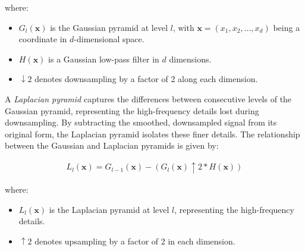 where:
\begin{itemize}
  \item \(G_l(\mathbf{x})\) is the Gaussian pyramid at level \(l\), with \(\mathbf{x} = (x_1, x_2, \dots, x_d)\) being a coordinate in \(d\)-dimensional space.
  \item \(H(\mathbf{x})\) is a Gaussian low-pass filter in \(d\) dimensions.
  \item \(\downarrow 2\) denotes downsampling by a factor of 2 along each dimension.
\end{itemize}
 
A \textit{Laplacian pyramid} captures the differences between consecutive levels of the Gaussian pyramid, representing the high-frequency details lost during downsampling. By subtracting the smoothed, downsampled signal from its original form, the Laplacian pyramid isolates these finer details. The relationship between the Gaussian and Laplacian pyramids is given by:

\begin{align}
  L_l(\mathbf{x}) = G_{l-1}(\mathbf{x}) - (G_l(\mathbf{x}) \uparrow 2 * H(\mathbf{x}))
\end{align}


where:
\begin{itemize}
  \item \(L_l(\mathbf{x})\) is the Laplacian pyramid at level \(l\), representing the high-frequency details.
  \item \(\uparrow 2\) denotes upsampling by a factor of 2 in each dimension.
\end{itemize} 

